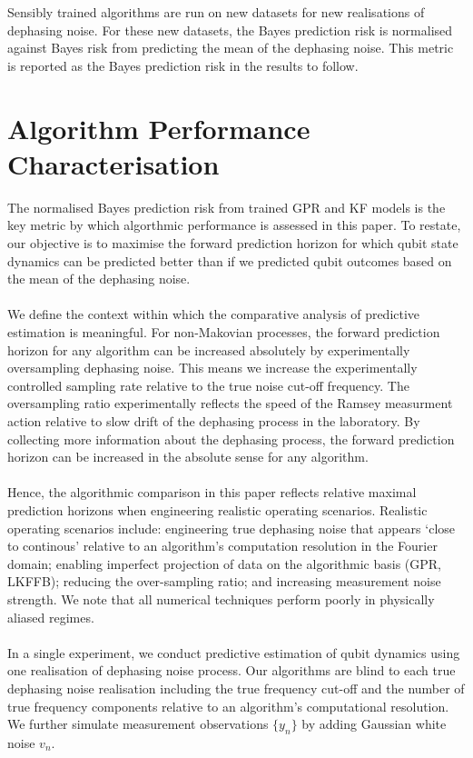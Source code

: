 \\
\\
Sensibly trained algorithms are run on new datasets for new realisations of dephasing noise. For these new datasets, the Bayes prediction risk is normalised against Bayes risk from predicting the mean of the dephasing noise. This metric is reported as the Bayes prediction risk in the results to follow. 

\section{Algorithm Performance Characterisation \label{sec:main:Performance}}

The normalised Bayes prediction risk from trained GPR and KF models is the key metric by which algorthmic performance is assessed in this paper. To restate, our objective is to maximise the forward prediction horizon for which qubit state dynamics can be predicted better than if we predicted qubit outcomes based on the mean of the dephasing noise. 
\\
\\
We define the context within which the comparative analysis of predictive estimation is meaningful. For non-Makovian processes, the forward prediction horizon for any algorithm can be increased absolutely by experimentally oversampling dephasing noise. This means we increase the experimentally controlled sampling rate relative to the true noise cut-off frequency. The oversampling ratio experimentally reflects the speed of the Ramsey measurment action relative to slow drift of the dephasing process in the laboratory. By collecting more information about the dephasing process, the forward prediction horizon can be increased in the absolute sense for any algorithm. 
\\
\\
Hence, the algorithmic comparison in this paper reflects relative maximal prediction horizons when engineering realistic operating scenarios. Realistic operating scenarios include: engineering true dephasing noise that appears `close to continous' relative to an algorithm's computation resolution in the Fourier domain; enabling imperfect projection of data on the algorithmic basis (GPR, LKFFB); reducing the over-sampling ratio; and increasing measurement noise strength. We note that all numerical techniques perform poorly in physically aliased regimes. 
\\
\\
In a single experiment, we conduct predictive estimation of qubit dynamics using one realisation of dephasing noise process. Our algorithms are blind to each true dephasing noise realisation including the true frequency cut-off and the number of true frequency components relative to an algorithm's computational resolution.  We further simulate measurement observations $\{ y_n \}$ by adding Gaussian white noise $v_n$.  

